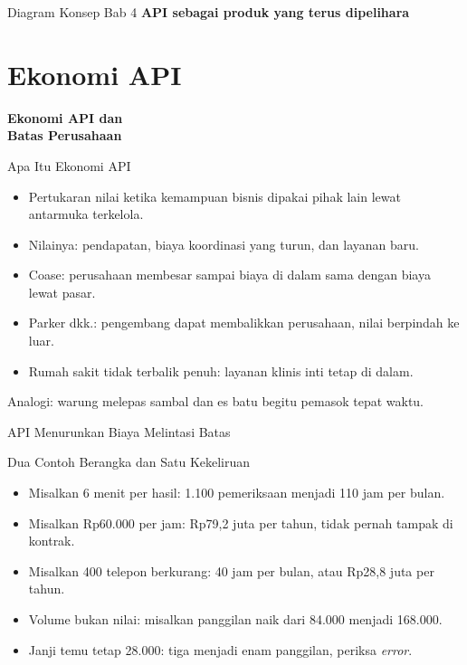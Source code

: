 \documentclass[aspectratio=169, table, 12pt]{beamer}
\begin{document}
\begin{frame}{{\Large Diagram Konsep Bab 4}}
  \centering
  {\small\bfseries API sebagai produk yang terus dipelihara}\par\medskip
\end{frame}

\section{Ekonomi API}

\begin{frame}{\hfill}
  \centering
  \Huge{\textbf{Ekonomi API dan\\Batas Perusahaan}}
\end{frame}

\begin{frame}{{\Large Apa Itu Ekonomi API}}
  \vspace{10pt}
  \begin{itemize}
    \item Pertukaran nilai ketika kemampuan bisnis dipakai pihak lain lewat antarmuka terkelola.
    \item Nilainya: pendapatan, biaya koordinasi yang turun, dan layanan baru.
    \item Coase: perusahaan membesar sampai biaya di dalam sama dengan biaya lewat pasar.
    \item Parker dkk.: pengembang dapat membalikkan perusahaan, nilai berpindah ke luar.
    \item Rumah sakit tidak terbalik penuh: layanan klinis inti tetap di dalam.
  \end{itemize}
  \vspace{6pt}
  {\small Analogi: warung melepas sambal dan es batu begitu pemasok tepat waktu.}
\end{frame}

\begin{frame}{{\Large API Menurunkan Biaya Melintasi Batas}}
  \centering
\end{frame}

\begin{frame}{{\Large Dua Contoh Berangka dan Satu Kekeliruan}}
  \vspace{10pt}
  \begin{itemize}
    \item Misalkan 6 menit per hasil: 1.100 pemeriksaan menjadi 110 jam per bulan.
    \item Misalkan Rp60.000 per jam: Rp79,2 juta per tahun, tidak pernah tampak di kontrak.
    \item Misalkan 400 telepon berkurang: 40 jam per bulan, atau Rp28,8 juta per tahun.
    \item Volume bukan nilai: misalkan panggilan naik dari 84.000 menjadi 168.000.
    \item Janji temu tetap 28.000: tiga menjadi enam panggilan, periksa \textit{error}.
  \end{itemize}
\end{frame}
\end{document}
